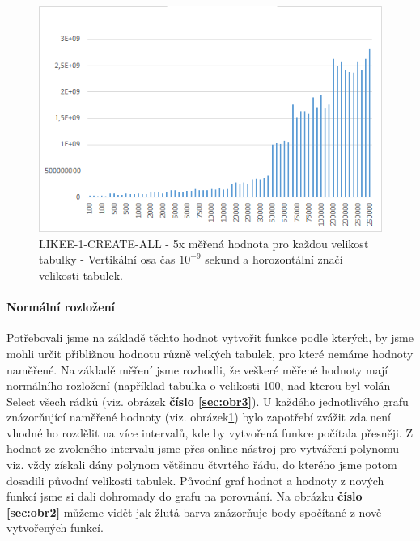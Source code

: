 \documentclass[a4paper, 11pt]{article}
\begin{document}
\begin{figure}[H]
\centering
\includegraphics[width=150mm, frame]{images/LIKEE-1-CREATE-ALL.png}
\caption{LIKEE-1-CREATE-ALL - 5x měřená hodnota pro každou velikost tabulky - Vertikální osa čas $10^{-9}$ sekund a horozontální značí velikosti tabulek.}
\label{sec:obr1}
\end{figure}

\paragraph{Normální rozložení} Potřebovali jsme na základě těchto hodnot vytvořit funkce podle kterých, by jsme mohli určit přibližnou hodnotu různě velkých tabulek, pro které nemáme hodnoty naměřené. Na základě měření jsme rozhodli, že veškeré měřené hodnoty mají normálního rozložení (například tabulka o velikosti 100, nad kterou byl volán Select všech rádků (viz. obrázek \textbf{číslo \ref{sec:obr3}}).
U každého jednotlivého grafu znázorňující naměřené hodnoty (viz. obrázek\ref{sec:obr1}) bylo zapotřebí zvážit zda není vhodné ho rozdělit na více intervalů, kde by  vytvořená funkce počítala přesněji. Z hodnot ze zvoleného intervalu jsme přes online nástroj pro vytváření polynomu viz. \cite{polregres} vždy získali dány polynom většinou čtvrtého řádu, do kterého jsme potom dosadili původní velikosti tabulek. Původní graf hodnot a hodnoty z nových funkcí jsme si dali dohromady do grafu na porovnání. Na obrázku \textbf{číslo \ref{sec:obr2}} můžeme vidět jak žlutá barva znázorňuje body spočítané z nově vytvořených funkcí. 
\end{document}
